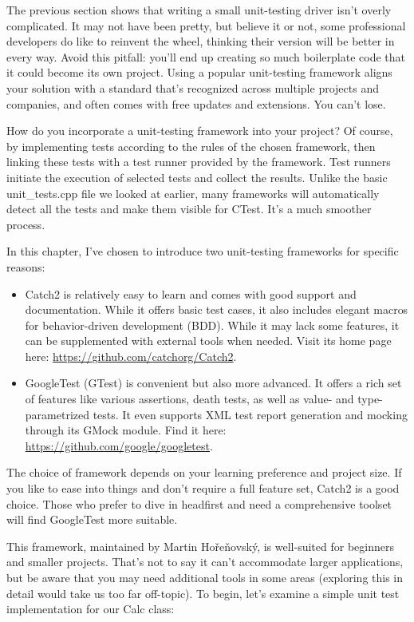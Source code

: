 
The previous section shows that writing a small unit-testing driver isn’t overly complicated. It may not have been pretty, but believe it or not, some professional developers do like to reinvent the wheel, thinking their version will be better in every way. Avoid this pitfall: you’ll end up creating so much boilerplate code that it could become its own project. Using a popular unit-testing framework aligns your solution with a standard that’s recognized across multiple projects and companies, and often comes with free updates and extensions. You can’t lose.

How do you incorporate a unit-testing framework into your project? Of course, by implementing tests according to the rules of the chosen framework, then linking these tests with a test runner provided by the framework. Test runners initiate the execution of selected tests and collect the results. Unlike the basic unit\_tests.cpp file we looked at earlier, many frameworks will automatically detect all the tests and make them visible for CTest. It’s a much smoother process.

In this chapter, I’ve chosen to introduce two unit-testing frameworks for specific reasons:

\begin{itemize}
\item
Catch2 is relatively easy to learn and comes with good support and documentation. While it offers basic test cases, it also includes elegant macros for behavior-driven development (BDD). While it may lack some features, it can be supplemented with external tools when needed. Visit its home page here: \url{https://github.com/catchorg/Catch2}.

\item
GoogleTest (GTest) is convenient but also more advanced. It offers a rich set of features like various assertions, death tests, as well as value- and type-parametrized tests. It even supports XML test report generation and mocking through its GMock module. Find it here: \url{https://github.com/google/googletest}.
\end{itemize}

The choice of framework depends on your learning preference and project size. If you like to ease into things and don’t require a full feature set, Catch2 is a good choice. Those who prefer to dive in headfirst and need a comprehensive toolset will find GoogleTest more suitable.


This framework, maintained by Martin Hořeňovský, is well-suited for beginners and smaller projects. That’s not to say it can’t accommodate larger applications, but be aware that you may need additional tools in some areas (exploring this in detail would take us too far off-topic). To begin, let’s examine a simple unit test implementation for our Calc class:

